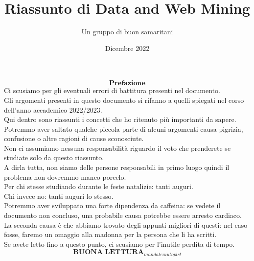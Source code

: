 \documentclass{book}
\title{Riassunto di Data and Web Mining}
\author{Un gruppo di buon samaritani}
\date{Dicembre 2022}
\begin{document}
\frontmatter
\maketitle
$$ \textbf{Prefazione} $$
Ci scusiamo per gli eventuali errori di battitura presenti nel documento.
\\
Gli argomenti presenti in questo documento si rifanno a quelli spiegati nel corso dell'anno accademico 2022/2023.
\\
Qui dentro sono riassunti i concetti che ho ritenuto più importanti da sapere.
\\
Potremmo aver saltato qualche piccola parte di alcuni argomenti causa pigrizia, confusione o altre ragioni di cause sconosciute.
\\
Non ci assumiamo nessuna responsabilità riguardo il voto che prenderete se studiate solo da questo riassunto.
\\
A dirla tutta, non siamo delle persone responsabili in primo luogo quindi il problema non dovremmo manco porcelo.
\\
Per chi stesse studiando durante le feste natalizie: tanti auguri.
\\
Chi invece no: tanti auguri lo stesso.
\\
Potremmo aver sviluppato una forte dipendenza da caffeina: se vedete il documento non concluso, una probabile causa potrebbe essere arresto cardiaco.
\\
La seconda causa è che abbiamo trovato degli appunti migliori di questi: nel caso fosse, faremo un omaggio alla madonna per la persona che li ha scritti.
\\
Se avete letto fino a questo punto, ci scusiamo per l'inutile perdita di tempo.
$$ \textbf{BUONA LETTURA}_{mandate aiuto pls!} $$


\mainmatter
\tableofcontents

    
    
    
    
    
    
    
    
    
    
\end{document}
